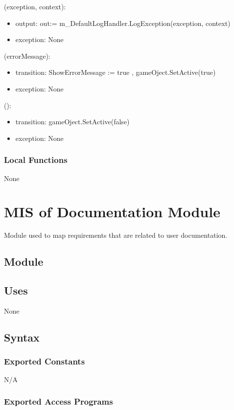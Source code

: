 \documentclass[12pt, titlepage]{article}
\begin{document}
(exception, context):
\begin{itemize}
\item output: out:= m\_DefaultLogHandler.LogException(exception, context)
\item exception: None
\end{itemize}

(errorMessage):
\begin{itemize}
\item transition: ShowErrorMessage := true , gameOject.SetActive(true)
\item exception: None
\end{itemize}

():
\begin{itemize}
\item transition: gameOject.SetActive(false)
\item exception: None
\end{itemize}


\subsubsection{Local Functions}
None

\newpage 

\section{MIS of {Documentation Module}} \label{DocModule} 
Module used to map requirements that are related to user documentation. 
\subsection{Module}

\subsection{Uses}
 None

\subsection{Syntax}

\subsubsection{Exported Constants}
N/A
\subsubsection{Exported Access Programs}
\end{document}
